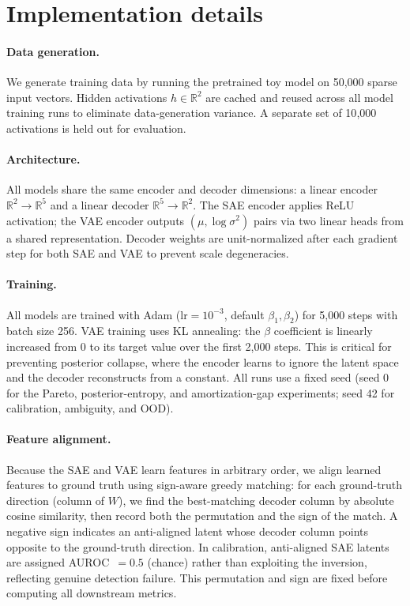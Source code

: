 \documentclass{article}
\begin{document}
\section{Implementation details}
\label{sec:implementation}

\paragraph{Data generation.}
We generate training data by running the pretrained toy model on 50{,}000 sparse input vectors. Hidden activations $h \in \mathbb{R}^2$ are cached and reused across all model training runs to eliminate data-generation variance. A separate set of 10{,}000 activations is held out for evaluation.

\paragraph{Architecture.}
All models share the same encoder and decoder dimensions: a linear encoder $\mathbb{R}^2 \to \mathbb{R}^5$ and a linear decoder $\mathbb{R}^5 \to \mathbb{R}^2$. The SAE encoder applies ReLU activation; the VAE encoder outputs $(\mu, \log \sigma^2)$ pairs via two linear heads from a shared representation. Decoder weights are unit-normalized after each gradient step for both SAE and VAE to prevent scale degeneracies.

\paragraph{Training.}
All models are trained with Adam ($\text{lr} = 10^{-3}$, default $\beta_1, \beta_2$) for 5{,}000 steps with batch size 256. VAE training uses KL annealing: the $\beta$ coefficient is linearly increased from 0 to its target value over the first 2{,}000 steps. This is critical for preventing posterior collapse, where the encoder learns to ignore the latent space and the decoder reconstructs from a constant. All runs use a fixed seed (seed 0 for the Pareto, posterior-entropy, and amortization-gap experiments; seed 42 for calibration, ambiguity, and OOD).

\paragraph{Feature alignment.}
Because the SAE and VAE learn features in arbitrary order, we align learned features to ground truth using sign-aware greedy matching: for each ground-truth direction (column of $W$), we find the best-matching decoder column by absolute cosine similarity, then record both the permutation and the sign of the match. A negative sign indicates an anti-aligned latent whose decoder column points opposite to the ground-truth direction. In calibration, anti-aligned SAE latents are assigned AUROC~$=0.5$ (chance) rather than exploiting the inversion, reflecting genuine detection failure. This permutation and sign are fixed before computing all downstream metrics.
\end{document}
